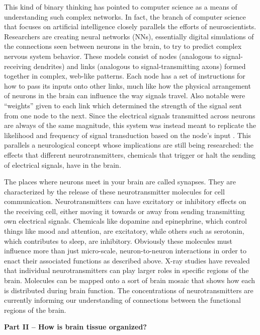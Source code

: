 This kind of binary thinking has pointed to computer science as a means of understanding such complex networks. In fact, the branch of computer science that focuses on artificial intelligence closely parallels the efforts of neuroscientists. Researchers are creating neural networks (NNs), essentially digital simulations of the connections seen between neurons in the brain, to try to predict complex nervous system behavior. These models consist of nodes (analogous to signal-receiving dendrites) and links (analogous to signal-transmitting axons) formed together in complex, web-like patterns. Each node has a set of instructions for how to pass its inputs onto other links, much like how the physical arrangement of neurons in the brain can influence the way signals travel. Also notable were “weights” given to each link which determined the strength of the signal sent from one node to the next. Since the electrical signals transmitted across neurons are always of the same magnitude, this system was instead meant to replicate the likelihood and frequency of signal transduction based on the node’s input \cite{rubinov}. This parallels a neurological concept whose implications are still being researched: the effects that different neurotransmitters, chemicals that trigger or halt the sending of electrical signals, have in the brain.

The places where neurons meet in your brain are called synapses. They are characterized by the release of these neurotransmitter molecules for cell communication. Neurotransmitters can have excitatory or inhibitory effects on the receiving cell, either moving it towards or away from sending transmitting own electrical signals. Chemicals like dopamine and epinephrine, which control things like mood and attention, are excitatory, while others such as serotonin, which contributes to sleep, are inhibitory. Obviously these molecules must influence more than just micro-scale, neuron-to-neuron interactions in order to enact their associated functions as described above. X-ray studies have revealed that individual neurotransmitters can play larger roles in specific regions of the brain. Molecules can be mapped onto a sort of brain mosaic that shows how each is distributed during brain function. The concentrations of neurotransmitters are currently informing our understanding of connections between the functional regions of the brain.

\noindent
\textbf{Part II – How is brain tissue organized?}

